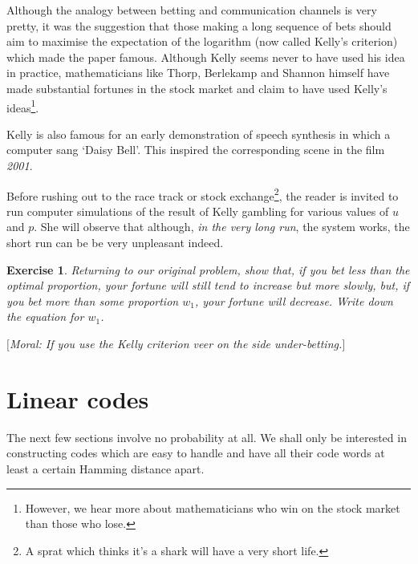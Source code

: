 \documentclass[12pt,a4paper]{article}
\theoremstyle{plain}
\newtheorem{exercise}[theorem]{Exercise}
\theoremstyle{definition}
\begin{document}
    Although the analogy between betting and communication
    channels is very pretty, it was the suggestion that
    those making a long sequence of bets should aim to
    maximise the expectation of the logarithm
    (now called Kelly's criterion) which
    made the paper famous. Although Kelly
    seems never to have used his idea in practice,
    mathematicians like Thorp, Berlekamp and Shannon himself
    have made substantial fortunes in the stock market
    and claim to have used Kelly's ideas\footnote{However,
    we hear more about mathematicians who win on the
    stock market than those who lose.}.

    Kelly is also famous for an early demonstration of
    speech synthesis in which a computer sang
    `Daisy Bell'. This inspired the corresponding
    scene in the film \emph{2001}.

    Before rushing out to the race track or stock
    exchange\footnote{A sprat which thinks it's a shark
    will have a very short life.},
    the reader
    is invited to run computer simulations of the result
    of Kelly gambling for various values of $u$ and $p$.
    She will observe that although, \emph{in the very long run},
    the system works, the short run can be be very
    unpleasant indeed.
    \begin{exercise}
        \label{E;Slow Kelly}
        Returning to our original problem, show that,
        if you bet less than the optimal proportion, your fortune
        will still tend to increase but more slowly, but, if you bet
        more than some proportion $w_{1}$, your fortune will decrease.
        Write down the equation for $w_{1}$.

        $[$Moral: If you use the Kelly criterion veer on the side under-betting.$]$
    \end{exercise}
    \section{Linear codes} The next few sections involve no
    probability at all. We shall only be interested in constructing
    codes which are easy to handle and have all their code words
    at least a certain Hamming distance apart.
\end{document}
